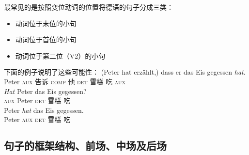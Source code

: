 最常见的是按照变位动词的位置将德语的句子分成三类：
\begin{itemize}
\item 动词位于末位的小句
\item 动词位于首位的小句
\item 动词位于第二位（V2）的小句
\end{itemize}
%
下面的例子说明了这些可能性：
\eal
\ex 
\gll (Peter hat erzählt,) dass er das Eis gegessen \emph{hat}.\\
     Peter \textsc{aux} 告诉 \textsc{comp} 他 \textsc{det} 雪糕 吃 \textsc{aux}\\
\ex 
\gll \emph{Hat} Peter das Eis gegessen?\\
	 \textsc{aux} Peter \textsc{det} 雪糕 吃\\
\ex 
\gll Peter \emph{hat} das Eis gegessen.\\
	 Peter \textsc{aux} \textsc{det} 雪糕 吃\\
\zl

\subsection{句子的框架结构、前场、中场及后场}

